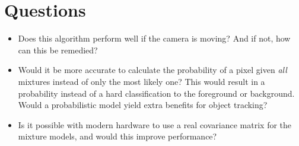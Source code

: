 \documentclass{article}
\begin{document}
\section{Questions}
	\begin{itemize}
		\item Does this algorithm perform well if the camera is moving? And if
			not, how can this be remedied?
		\item Would it be more accurate to calculate the probability of a pixel
			given \emph{all} mixtures instead of only the most likely one? This
			would result in a probability instead of a hard classification to
			the foreground or background. Would a probabilistic model yield
			extra benefits for object tracking?
		\item Is it possible with modern hardware to use a real covariance
			matrix for the mixture models, and would this improve performance?
	\end{itemize}
\end{document}
